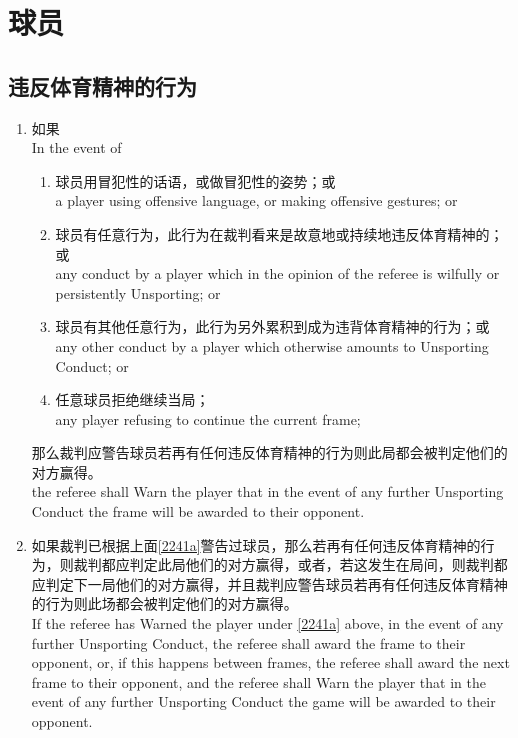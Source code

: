 \section{球员}\label{224}

\subsection{违反体育精神的行为}\label{2241}

\begin{enumerate}[label=(\alph*)]
    \item \label{2241a}如果\\
    In the event of
    \begin{enumerate}[label=(\roman*)]
        \item 球员用冒犯性的话语，或做冒犯性的姿势；或\\
        a player using offensive language, or making offensive gestures; or
        \item 球员有任意行为，此行为在裁判看来是故意地或持续地违反体育精神的；或\\
        any conduct by a player which in the opinion of the referee is wilfully or persistently Unsporting; or
        \item 球员有其他任意行为，此行为另外累积到成为违背体育精神的行为；或\\
        any other conduct by a player which otherwise amounts to Unsporting Conduct; or
        \item 任意球员拒绝继续当局；\\
        any player refusing to continue the current frame;
    \end{enumerate}
    那么裁判应警告球员若再有任何违反体育精神的行为则此局都会被判定他们的对方赢得。\\
    the referee shall Warn the player that in the event of any further Unsporting Conduct the frame will be awarded to their opponent.
    \item \label{2241b}如果裁判已根据上面\ref{2241a}警告过球员，那么若再有任何违反体育精神的行为，则裁判都应判定此局他们的对方赢得，或者，若这发生在局间，则裁判都应判定下一局他们的对方赢得，并且裁判应警告球员若再有任何违反体育精神的行为则此场都会被判定他们的对方赢得。\\
    If the referee has Warned the player under \ref{2241a} above, in the event of any further Unsporting Conduct, the referee shall award the frame to their opponent, or, if this happens between frames, the referee shall award the next frame to their opponent, and the referee shall Warn the player that in the event of any further Unsporting Conduct the game will be awarded to their opponent.

\end{enumerate}
